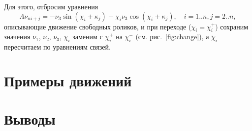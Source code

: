 Для этого, отбросим уравнения
$$
\Lambda\dot{\nu}_{ni+j} = -\dot{\nu}_3\sin(\chi_i+\kappa_j) - \dot{\chi_i}\nu_3\cos(\chi_i+\kappa_j), \quad i = 1..n, j = 2..n,
$$
описывающие движение свободных роликов, и при переходе ($\chi_i = \chi_i^+$) сохраним значения $\nu_1$, $\nu_2$, 
$\nu_3$, $\chi_i$ заменим с $\chi_i^+$ на $\chi_i^-$ (см. рис.~\ref{fig:change}), а $\dot\chi_i$ пересчитаем по уравнениям связей.


\section{Примеры движений}

\section{Выводы}




